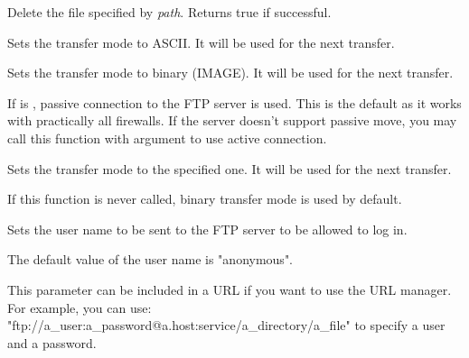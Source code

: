 
Delete the file specified by {\it path}. Returns true if successful.



\label{wxftpsetascii}


Sets the transfer mode to ASCII. It will be used for the next transfer.


\label{wxftpsetbinary}


Sets the transfer mode to binary (IMAGE). It will be used for the next transfer.


\label{wxftpsetpassive}


If  is \true, passive connection to the FTP server is used. This is
the default as it works with practically all firewalls. If the server doesn't
support passive move, you may call this function with \false argument to use
active connection.


\label{wxftpsettransfermode}


Sets the transfer mode to the specified one. It will be used for the next
transfer.

If this function is never called, binary transfer mode is used by default.



\label{wxftpsetuser}


Sets the user name to be sent to the FTP server to be allowed to log in.


The default value of the user name is "anonymous".


This parameter can be included in a URL if you want to use the URL manager.
For example, you can use: "ftp://a\_user:a\_password@a.host:service/a\_directory/a\_file"
to specify a user and a password.


